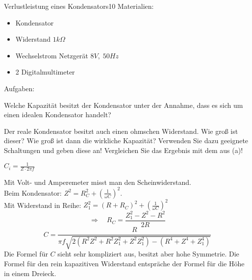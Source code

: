\begin{problem}{Verlustleistung eines Kondensators}{10}
Materialien:
\begin{itemize}
\item Kondensator
\item Widerstand $1\unit{k\Omega}$
\item Wechselstrom Netzgerät $8\unit{V},\; 50\unit{Hz}$
\item 2 Digitalmultimeter
\end{itemize}
Aufgaben:
\begin{abcenum}
\item Welche Kapazität besitzt der Kondensator unter der Annahme, dass es sich um einen idealen Kondensator handelt?
\item Der reale Kondensator besitzt auch einen ohmschen Widerstand. Wie groß ist dieser? Wie groß ist dann die wirkliche Kapazität? Verwenden Sie dazu geeignete Schaltungen und geben diese an! Vergleichen Sie das Ergebnis mit dem aus (a)!
\end{abcenum}
\begin{expsolution}
\begin{abcenum}
\item $C_i=\frac{1}{Z\cdot 2\pi f}$
\item Mit Volt- und Amperemeter misst man den Scheinwiderstand.\\
Beim Kondensator: $Z^2=R_C^2+(\frac{1}{\omega C})^2$.\\
Mit Widerstand in Reihe: $Z_1^2=(R+R_C)^2+(\frac{1}{\omega C})^2$
\[
\Rightarrow\quad R_C=\frac{Z_1^2-Z^2-R^2}{2R}
\]
\[
C=\frac{R}{\pi f \sqrt{2(R^2Z^2+R^2Z_1^2+Z^2Z_1^2)-(R^4+Z^4+Z_1^4)}}
\]
Die Formel für $C$ sieht sehr kompliziert aus, besitzt aber hohe Symmetrie. Die Formel für den rein kapazitiven Widerstand entspräche der Formel für die Höhe in einem Dreieck.
\end{abcenum}
\end{expsolution}
\end{problem}



